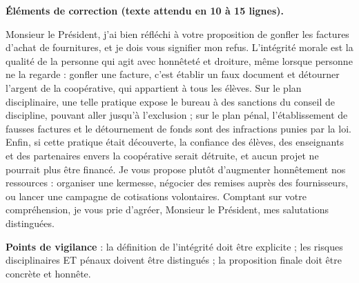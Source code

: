 \documentclass[11pt]{article}
\begin{document}
\begin{corrige}
\textbf{Éléments de correction (texte attendu en 10 à 15 lignes).}

Monsieur le Président, j'ai bien réfléchi à votre proposition de gonfler les factures d'achat de fournitures, et je dois vous signifier mon refus. L'intégrité morale est la qualité de la personne qui agit avec honnêteté et droiture, même lorsque personne ne la regarde : gonfler une facture, c'est établir un faux document et détourner l'argent de la coopérative, qui appartient à tous les élèves. Sur le plan disciplinaire, une telle pratique expose le bureau à des sanctions du conseil de discipline, pouvant aller jusqu'à l'exclusion ; sur le plan pénal, l'établissement de fausses factures et le détournement de fonds sont des infractions punies par la loi. Enfin, si cette pratique était découverte, la confiance des élèves, des enseignants et des partenaires envers la coopérative serait détruite, et aucun projet ne pourrait plus être financé. Je vous propose plutôt d'augmenter honnêtement nos ressources : organiser une kermesse, négocier des remises auprès des fournisseurs, ou lancer une campagne de cotisations volontaires. Comptant sur votre compréhension, je vous prie d'agréer, Monsieur le Président, mes salutations distinguées.

\textbf{Points de vigilance} : la définition de l'intégrité doit être explicite ; les risques disciplinaires ET pénaux doivent être distingués ; la proposition finale doit être concrète et honnête.
\end{corrige}
\end{document}
